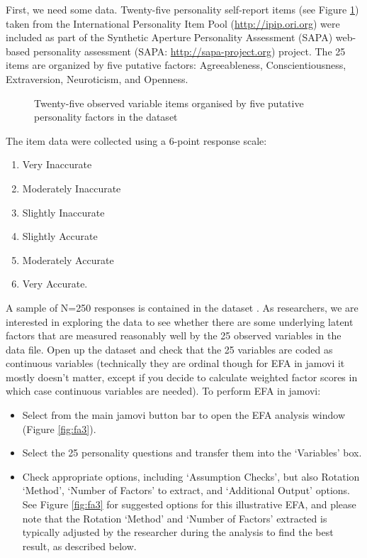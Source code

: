 
First, we need some data. Twenty-five personality self-report items (see Figure \ref{fig:fa2}) taken from the International Personality Item Pool (\url{http://ipip.ori.org}) were included as part of the Synthetic Aperture Personality Assessment (SAPA) web-based personality assessment (SAPA: \url{http://sapa-project.org}) project. The 25 items are organized by five putative factors: Agreeableness, Conscientiousness, Extraversion, Neuroticism, and Openness. 

\begin{figure}[!htb]
\begin{center}
\caption{Twenty-five observed variable items organised by five putative personality factors in the dataset }
\label{fig:fa2}
\HR
\end{center}
\end{figure}

The item data were collected using a 6-point response scale:

\begin{enumerate} \itemsep -2pt
\item Very Inaccurate
\item Moderately Inaccurate
\item Slightly Inaccurate
\item Slightly Accurate
\item Moderately Accurate
\item Very Accurate. 
\end{enumerate}


A sample of N=250 responses is contained in the dataset . As researchers, we are interested in exploring the data to see whether there are some underlying latent factors that are measured reasonably well by the 25 observed variables in the  data file. Open up the dataset and check that the 25 variables are coded as continuous variables (technically they are ordinal though for EFA in jamovi it mostly doesn't matter, except if you decide to calculate weighted factor scores in which case continuous variables are needed). To perform EFA in jamovi:

\begin{itemize} \itemsep -2pt
\item Select  from the main jamovi button bar to open the EFA analysis window (Figure \ref{fig:fa3}).
\item Select the 25 personality questions and transfer them into the ‘Variables’ box.
\item Check appropriate options, including ‘Assumption Checks’, but also Rotation ‘Method’, ‘Number of Factors’ to extract, and ‘Additional Output’ options. See Figure \ref{fig:fa3} for suggested options for this illustrative EFA, and please note that the Rotation ‘Method’ and ‘Number of Factors’ extracted is typically adjusted by the researcher during the analysis to find the best result, as described below.
\end{itemize}

